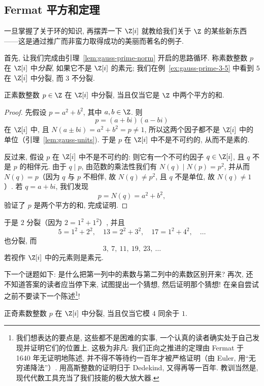 \subsection{Fermat 平方和定理}
\label{subsec:fermat-squares}

一旦掌握了关于环的知识, 再摆弄一下 $\Z[i]$ 就教给我们关于 $\Z$ 的某些新东西——这是通过推广而非蛮力取得成功的美丽而著名的例子.

首先, 让我们完成由引理~\ref{lem:gauss-prime-norm} 开启的思路循环. 称素数整数 $p$ 在 $\Z[i]$ 中\emph{分裂}, 如果它不是 $\Z[i]$ 的素元; 我们在例~\ref{ex:gauss-prime-3-5} 中看到 $5$ 在 $\Z[i]$ 中分裂, 而 $3$ 不分裂.

\begin{lemma}\label{lem:split-sum-two-squares}
正素数整数 $p\in\Z$ 在 $\Z[i]$ 中分裂, 当且仅当它是 $\Z$ 中两个平方的和.
\end{lemma}

\begin{proof}
先假设 $p=a^2+b^2$, 其中 $a,b\in\Z$. 则
\[
p=(a+bi)(a-bi)
\]
在 $\Z[i]$ 中, 且 $N(a\pm bi)=a^2+b^2=p\neq 1$, 所以这两个因子都不是 $\Z[i]$ 中的单位（引理~\ref{lem:gauss-units}). 于是 $p$ 在 $\Z[i]$ 中不是不可约的, 从而不是素的.

反过来, 假设 $p$ 在 $\Z[i]$ 中不是不可约的: 则它有一个不可约因子 $q\in\Z[i]$, 且 $q$ 不是 $p$ 的相伴元. 由于 $q\mid p$, 由范数的乘法性我们有 $N(q)\mid N(p)=p^2$, 并从而 $N(q)=p$（因为 $q$ 与 $p$ 不相伴, 故 $N(q)\neq p^2$, 且 $q$ 不是单位, 故 $N(q)\neq 1$）. 若 $q=a+bi$, 我们发现
\[
p=N(q)=a^2+b^2,
\]
验证了 $p$ 是两个平方的和, 完成证明.
\end{proof}

于是 $2$ 分裂（因为 $2=1^2+1^2$）, 并且
\[
5=1^2+2^2,\quad 13=2^2+3^2,\quad 17=1^2+4^2,\quad\ldots
\]
也分裂, 而
\[
3,\ 7,\ 11,\ 19,\ 23,\ \ldots
\]
若视作 $\Z[i]$ 中的元素则是素元.

下一个谜题如下: 是什么把第一列中的素数与第二列中的素数区别开来? 再次, 还不知道答案的读者应当停下来, 试图提出一个猜想, 然后证明那个猜想! 在亲自尝试之前不要读下一个陈述\footnote{我们想表达的要点是, 这些都不是困难的实事, 一个认真的读者确实处于自己发现并证明它们的位置上. 这极为非凡: 我们正向之推进的定理由 Fermat 于 1640 年无证明地陈述, 并不得不等待约一百年才被严格证明（由 Euler, 用``无穷递降法''）. 用高斯整数的证明归于 Dedekind, 又得再等一百年. 教训当然是, 现代代数工具充当了我们技能的极大放大器.}!

\begin{lemma}\label{lem:split-mod4}
正奇素数整数 $p$ 在 $\Z[i]$ 中分裂, 当且仅当它模 $4$ 同余于 $1$.
\end{lemma}

